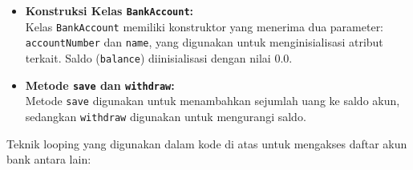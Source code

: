 \begin{itemize}
	\item \textbf{Konstruksi Kelas \texttt{BankAccount}:} \\
	Kelas \texttt{BankAccount} memiliki konstruktor yang menerima dua parameter: \texttt{accountNumber} dan \texttt{name}, yang digunakan untuk menginisialisasi atribut terkait. Saldo (\texttt{balance}) diinisialisasi dengan nilai 0.0.
	
	\item \textbf{Metode \texttt{save} dan \texttt{withdraw}:} \\
	Metode \texttt{save} digunakan untuk menambahkan sejumlah uang ke saldo akun, sedangkan \texttt{withdraw} digunakan untuk mengurangi saldo.
\end{itemize}


Teknik looping yang digunakan dalam kode di atas untuk mengakses daftar akun bank antara lain:

